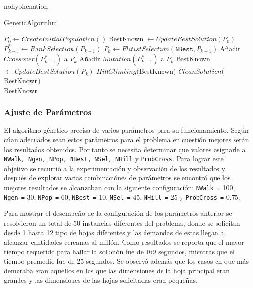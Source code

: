 \documentclass[a4paper,10pt,twocolumn]{article}
\begin{document}
\begin{hyphenrules}{nohyphenation}
\algrenewcommand{}
\algrenewcommand{}
\begin{algorithm}
	\caption{GeneticAlgorithm}\label{genetic}
	\begin{algorithmic}[1]
		\State $P_0 \gets CreateInitialPopulation()$
		\State BestKnown $\gets UpdateBestSolution(P_0)$
		\State$P_{k-1}^* \gets RankSelection(P_{k-1})$
		\State$P_{k} \gets ElitistSelection(\mathtt{NBest},P_{k-1})$
					\State Añadir $Crossover(P_{k-1}^*)$ a $P_k$
				\Else
					\State Añadir $Mutation(P_{k-1}^*)$ a $P_k$
				\EndIf	
			\EndFor
		\State BestKnown $\gets UpdateBestSolution(P_k)$
		\EndFor
		\State $ HillClimbing($BestKnown$)$
		\State $ CleanSolution($BestKnown$)$\\
		\Return BestKnown
	\end{algorithmic}
\end{algorithm}


\subsubsection{Ajuste de Parámetros}
El algoritmo génetico precisa de varios parámetros para su funcionamiento. Según cúan adecuados sean estos parámetros para el problema en cuestión mejores serán los resultados obtenidos. Por tanto se necesita determinar que valores asignarle a \texttt{NWalk, Ngen, NPop, NBest, NSel, NHill} y \texttt{ProbCross}.
Para lograr este objetivo se recurrió a la experimentación y observación de los resultados y después de explorar varias combinaciónes de parámetros se encontró que los mejores resultados se alcanzaban con la siguiente configuración: \texttt{NWalk =} 100, \texttt{Ngen =} 30, \texttt{NPop =} 60, \texttt{NBest =} 10, \texttt{NSel =} 45, \texttt{NHill =} 25 y \texttt{ProbCross =} 0.75.

Para mostrar el desempe\~no de la configuración de los par\'ametros anterior se resolvieron un total de 50 instancias diferentes del problema, donde se solicitan desde 1 hasta 12 tipo de hojas diferentes y las demandas de estas llegan a alcanzar cantidades cercanas al mill\'on. Como resultados se reporta que el mayor tiempo requerido para hallar la soluci\'on fue de 169 segundos, mientras que el tiempo promedio fue de 25 segundos. Se observ\'o adem\'as que los casos en que m\'as demoraba eran aquellos en los que las dimensiones de la hoja principal eran grandes y las dimensiones de las hojas solicitadas eran peque\~nas.    


\end{hyphenrules}
\end{document}
